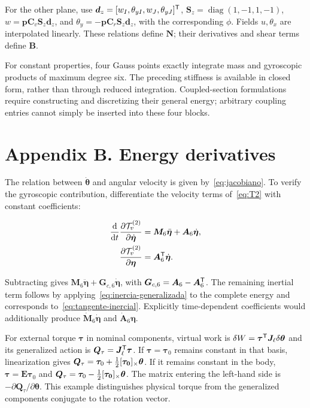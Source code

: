 For the other plane, use $\bm d_z=[w_I,\theta_{yI},w_J,\theta_{yJ}]^\mathsf T$, $\bm S_z=\operatorname{diag}(1,-1,1,-1)$, $w=\bm p\bm C_v\bm S_z\bm d_z$, and $\theta_y=-\bm p\bm C_r\bm S_z\bm d_z$, with the corresponding $\phi$. Fields $u,\theta_x$ are interpolated linearly. These relations define $\bm N$; their derivatives and shear terms define $\bm B$.

For constant properties, four Gauss points exactly integrate mass and gyroscopic products of maximum degree six. The preceding stiffness is available in closed form, rather than through reduced integration. Coupled-section formulations require constructing and discretizing their general energy; arbitrary coupling entries cannot simply be inserted into these four blocks.

\section{Appendix B. Energy derivatives}
The relation between $\dot{\bm\theta}$ and angular velocity is given by~\eqref{eq:jacobiano}. To verify the gyroscopic contribution, differentiate the velocity terms of~\eqref{eq:T2} with constant coefficients:

\begin{align}
\frac{\mathrm d}{\mathrm d t}\frac{\partial\mathcal T_v^{(2)}}{\partial\dot{\bm\eta}}
&=\bm M_6\ddot{\bm\eta}+\bm A_6\dot{\bm\eta},\nonumber\\
\frac{\partial\mathcal T_v^{(2)}}{\partial\bm\eta}
&=\bm A_6^\mathsf T\dot{\bm\eta}.
\end{align}

Subtracting gives $\bm M_6\ddot{\bm\eta}+\bm G_{c,6}\dot{\bm\eta}$, with $\bm G_{c,6}=\bm A_6-\bm A_6^\mathsf T$. The remaining inertial term follows by applying~\eqref{eq:inercia-generalizada} to the complete energy and corresponds to~\eqref{eq:tangente-inercial}. Explicitly time-dependent coefficients would additionally produce $\dot{\bm M}_6\dot{\bm\eta}$ and $\dot{\bm A}_6\bm\eta$.

For external torque $\bm\tau$ in nominal components, virtual work is $\delta W=\bm\tau^\mathsf T\bm J_\ell\delta\bm\theta$ and its generalized action is $\bm Q_\tau=\bm J_\ell^\mathsf T\bm\tau$. If $\bm\tau=\bm\tau_0$ remains constant in that basis, linearization gives $\bm Q_\tau=\bm\tau_0+\tfrac12[\bm{\tau_0}]_\times\bm\theta$. If it remains constant in the body, $\bm\tau=\bm E\bm\tau_0$ and $\bm Q_\tau=\bm\tau_0-\tfrac12[\bm{\tau_0}]_\times\bm\theta$. The matrix entering the left-hand side is $-\partial\bm Q_\tau/\partial\bm\theta$. This example distinguishes physical torque from the generalized components conjugate to the rotation vector.

